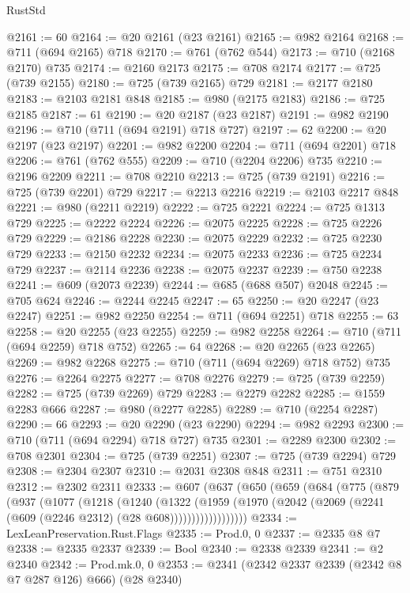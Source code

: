 \begin{lexlean}{RustStd}
\begin{coremodule}
@2161 := 60
@2164 := @20 @2161 (@23 @2161)
@2165 := @982 @2164
@2168 := @711 (@694 @2165) @718
@2170 := @761 (@762 @544)
@2173 := @710 (@2168 @2170) @735
@2174 := @2160 @2173
@2175 := @708 @2174
@2177 := @725 (@739 @2155)
@2180 := @725 (@739 @2165) @729
@2181 := @2177 @2180
@2183 := @2103 @2181 @848
@2185 := @980 (@2175 @2183)
@2186 := @725 @2185
@2187 := 61
@2190 := @20 @2187 (@23 @2187)
@2191 := @982 @2190
@2196 := @710 (@711 (@694 @2191) @718 @727)
@2197 := 62
@2200 := @20 @2197 (@23 @2197)
@2201 := @982 @2200
@2204 := @711 (@694 @2201) @718
@2206 := @761 (@762 @555)
@2209 := @710 (@2204 @2206) @735
@2210 := @2196 @2209
@2211 := @708 @2210
@2213 := @725 (@739 @2191)
@2216 := @725 (@739 @2201) @729
@2217 := @2213 @2216
@2219 := @2103 @2217 @848
@2221 := @980 (@2211 @2219)
@2222 := @725 @2221
@2224 := @725 @1313 @729
@2225 := @2222 @2224
@2226 := @2075 @2225
@2228 := @725 @2226 @729
@2229 := @2186 @2228
@2230 := @2075 @2229
@2232 := @725 @2230 @729
@2233 := @2150 @2232
@2234 := @2075 @2233
@2236 := @725 @2234 @729
@2237 := @2114 @2236
@2238 := @2075 @2237
@2239 := @750 @2238
@2241 := @609 (@2073 @2239)
@2244 := @685 (@688 @507) @2048
@2245 := @705 @624
@2246 := @2244 @2245
@2247 := 65
@2250 := @20 @2247 (@23 @2247)
@2251 := @982 @2250
@2254 := @711 (@694 @2251) @718
@2255 := 63
@2258 := @20 @2255 (@23 @2255)
@2259 := @982 @2258
@2264 := @710 (@711 (@694 @2259) @718 @752)
@2265 := 64
@2268 := @20 @2265 (@23 @2265)
@2269 := @982 @2268
@2275 := @710 (@711 (@694 @2269) @718 @752) @735
@2276 := @2264 @2275
@2277 := @708 @2276
@2279 := @725 (@739 @2259)
@2282 := @725 (@739 @2269) @729
@2283 := @2279 @2282
@2285 := @1559 @2283 @666
@2287 := @980 (@2277 @2285)
@2289 := @710 (@2254 @2287)
@2290 := 66
@2293 := @20 @2290 (@23 @2290)
@2294 := @982 @2293
@2300 := @710 (@711 (@694 @2294) @718 @727) @735
@2301 := @2289 @2300
@2302 := @708 @2301
@2304 := @725 (@739 @2251)
@2307 := @725 (@739 @2294) @729
@2308 := @2304 @2307
@2310 := @2031 @2308 @848
@2311 := @751 @2310
@2312 := @2302 @2311
@2333 := @607
    (@637
      (@650
        (@659
          (@684
            (@775
              (@879
                (@937
                  (@1077
                    (@1218
                      (@1240
                        (@1322
                          (@1959
                            (@1970
                              (@2042 (@2069 (@2241 (@609 (@2246 @2312) (@28 @608))))))))))))))))))
@2334 := LexLeanPreservation.Rust.Flags
@2335 := Prod.{0, 0}
@2337 := @2335 @8 @7
@2338 := @2335 @2337
@2339 := Bool
@2340 := @2338 @2339
@2341 := @2 @2340
@2342 := Prod.mk.{0, 0}
@2353 := @2341 (@2342 @2337 @2339 (@2342 @8 @7 @287 @126) @666) (@28 @2340)

\end{coremodule}
\end{lexlean}

